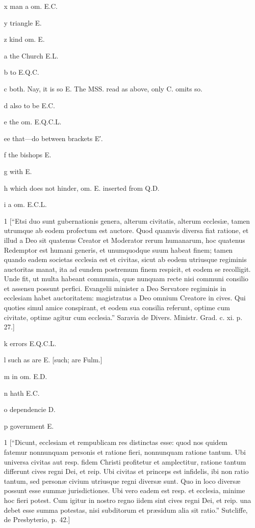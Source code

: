 x
man a om. E.C.

y
triangle E.

z
kind om. E.

a
the Church E.L.

b
to E.Q.C.

c
both. Nay, it is so E. The MSS. read as above, only C. omits so.

d
also to be E.C.

e
the om. E.Q.C.L.

ee
that—do between brackets E′.

f
the bishops E.

g
with E.

h
which does not hinder, om. E. inserted from Q.D.

i
a om. E.C.L.

1
[“Etsi duo sunt gubernationis genera, alterum civitatis, alterum ecclesiæ, tamen utrumque ab eodem profectum est auctore. Quod quamvis diversa fiat ratione, et illud a Deo sit quatenus Creator et Moderator rerum humanarum, hoc quatenus Redemptor est humani generis, et unumquodque suum habeat finem; tamen quando eadem societas ecclesia est et civitas, sicut ab eodem utriusque regiminis auctoritas manat, ita ad eundem postremum finem respicit, et eodem se recolligit. Unde fit, ut multa habeant communia, quæ nunquam recte nisi communi consilio et assensu possunt perfici. Evangelii minister a Deo Servatore regiminis in ecclesiam habet auctoritatem: magistratus a Deo omnium Creatore in cives. Qui quoties simul amice conspirant, et eodem sua consilia referunt, optime cum civitate, optime agitur cum ecclesia.” Saravia de Divers. Ministr. Grad. c. xi. p. 27.]

k
errors E.Q.C.L.

l
such as are E. [such; are Fulm.]

m
in om. E.D.

n
hath E.C.

o
dependencie D.

p
government E.

1
[“Dicunt, ecclesiam et rempublicam res distinctas esse: quod nos quidem fatemur nonnunquam personis et ratione fieri, nonnunquam ratione tantum. Ubi universa civitas aut resp. fidem Christi profitetur et amplectitur, ratione tantum differunt cives regni Dei, et reip. Ubi civitas et princeps est infidelis, ibi non ratio tantum, sed personæ civium utriusque regni diversæ sunt. Quo in loco diversæ possunt esse summæ jurisdictiones. Ubi vero eadem est resp. et ecclesia, minime hoc fieri potest. Cum igitur in nostro regno iidem sint cives regni Dei, et reip. una debet esse summa potestas, nisi subditorum et præsidum alia sit ratio.” Sutcliffe, de Presbyterio, p. 42.]

